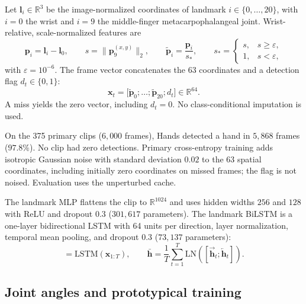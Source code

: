 \documentclass[11pt,a4paper]{article}
\begin{document}
Let $\mathbf{l}_i \in \mathbb{R}^{3}$ be the image-normalized coordinates of landmark $i \in \{0,\ldots,20\}$, with $i=0$ the wrist and $i=9$ the middle-finger metacarpophalangeal joint. Wrist-relative, scale-normalized features are
\begin{equation}
\mathbf{p}_i = \mathbf{l}_i - \mathbf{l}_0, \qquad
s = \lVert \mathbf{p}_{9}^{(x,y)} \rVert_2, \qquad
\tilde{\mathbf{p}}_i = \frac{\mathbf{p}_i}{s_*}, \qquad
s_* = \begin{cases}s,&s\geq\varepsilon,\\1,&s<\varepsilon,\end{cases}
\end{equation}
with $\varepsilon = 10^{-6}$. The frame vector concatenates the 63 coordinates and a detection flag $d_t \in \{0,1\}$:
\begin{equation}
\mathbf{x}_t = \bigl[\tilde{\mathbf{p}}_0;\ldots;\tilde{\mathbf{p}}_{20}; d_t\bigr] \in \mathbb{R}^{64}.
\end{equation}
A miss yields the zero vector, including $d_t=0$. No class-conditional imputation is used.

On the 375 primary clips ($6{,}000$ frames), Hands detected a hand in $5{,}868$ frames ($97.8\%$). No clip had zero detections. Primary cross-entropy training adds isotropic Gaussian noise with standard deviation $0.02$ to the 63 spatial coordinates, including initially zero coordinates on missed frames; the flag is not noised. Evaluation uses the unperturbed cache.

The landmark MLP flattens the clip to $\mathbb{R}^{1024}$ and uses hidden widths $256$ and $128$ with ReLU and dropout $0.3$ ($301{,}617$ parameters). The landmark BiLSTM is a one-layer bidirectional LSTM with 64 units per direction, layer normalization, temporal mean pooling, and dropout $0.3$ ($73{,}137$ parameters):
\begin{equation}
[\overrightarrow{\mathbf{h}}_t; \overleftarrow{\mathbf{h}}_t] = \mathrm{LSTM}(\mathbf{x}_{1:T}), \qquad
\bar{\mathbf{h}} = \frac{1}{T}\sum_{t=1}^{T} \mathrm{LN}([\overrightarrow{\mathbf{h}}_t; \overleftarrow{\mathbf{h}}_t]).
\end{equation}

\subsection{Joint angles and prototypical training}
\end{document}
